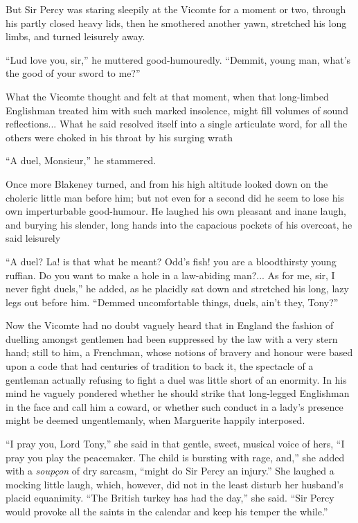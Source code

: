 But Sir Percy was staring sleepily at the Vicomte for a moment or two, through his partly closed heavy lids, then he smothered another yawn, stretched his long limbs, and turned leisurely away.

\enquote{Lud love you, sir,} he muttered good-humouredly. \enquote{Demmit, young man, what's the good of your sword to me?}

What the Vicomte thought and felt at that moment, when that long-limbed Englishman treated him with such marked insolence, might fill volumes of sound reflections... What he said resolved itself into a single articulate word, for all the others were choked in his throat by his surging wrath\longdash


\enquote{A duel, Monsieur,} he stammered.

Once more Blakeney turned, and from his high altitude looked down on the choleric little man before him; but not even for a second did he seem to lose his own imperturbable good-humour. He laughed his own pleasant and inane laugh, and burying his slender, long hands into the capacious pockets of his overcoat, he said leisurely\longdash


\enquote{A duel? La! is that what he meant? Odd's fish! you are a bloodthirsty young ruffian. Do you want to make a hole in a law-abiding man?... As for me, sir, I never fight duels,} he added, as he placidly sat down and stretched his long, lazy legs out before him. \enquote{Demmed uncomfortable things, duels, ain't they, Tony?}

Now the Vicomte had no doubt vaguely heard that in England the fashion of duelling amongst gentlemen had been suppressed by the law with a very stern hand; still to him, a Frenchman, whose notions of bravery and honour were based upon a code that had centuries of tradition to back it, the spectacle of a gentleman actually refusing to fight a duel was little short of an enormity. In his mind he vaguely pondered whether he should strike that long-legged Englishman in the face and call him a coward, or whether such conduct in a lady's presence might be deemed ungentlemanly, when Marguerite happily interposed.

\enquote{I pray you, Lord Tony,} she said in that gentle, sweet, musical voice of hers, \enquote{I pray you play the peacemaker. The child is bursting with rage, and,} she added with a \textit{soupçon} of dry sarcasm, \enquote{might do Sir Percy an injury.} She laughed a mocking little laugh, which, however, did not in the least disturb her husband's placid equanimity. \enquote{The British turkey has had the day,} she said. \enquote{Sir Percy would provoke all the saints in the calendar and keep his temper the while.}

